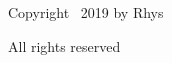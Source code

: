 \cleardoublepage{}

\noindent Copyright \textcopyright\ 2019 by Rhys

\noindent All rights reserved

\thispagestyle{empty}
\cleardoublepage{}
